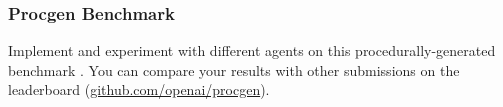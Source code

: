 \documentclass[a4paper]{article}
\begin{document}







\subsubsection{Procgen Benchmark}
Implement and experiment with different agents on this procedurally-generated benchmark \cite{procgen2020}.
You can compare your results with other submissions on the leaderboard (\url{github.com/openai/procgen}).
\end{document}
